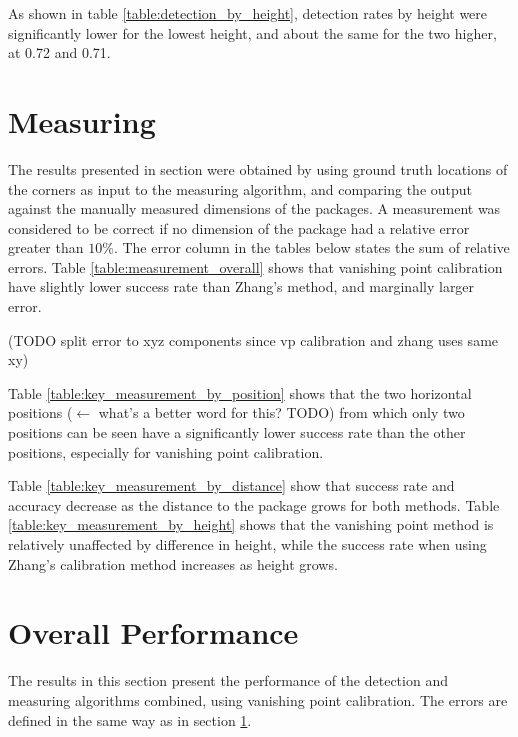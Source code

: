 As shown in table \ref{table:detection_by_height}, detection rates by height were significantly lower for the lowest height, and about the same for the two higher, at 0.72 and 0.71.


\section{Measuring} \label{results:measuring} 
The results presented in section were obtained by using ground truth locations of the corners as input to the measuring algorithm, and comparing the output against the manually measured dimensions of the packages.
A measurement was considered to be correct if no dimension of the package had a relative error greater than $10\%$.
The error column in the tables below states the sum of relative errors. 
Table \ref{table:measurement_overall} shows that vanishing point calibration have slightly lower success rate than Zhang's method, and marginally larger error.

(TODO split error to xyz components since vp calibration and zhang uses same xy) %






Table \ref{table:key_measurement_by_position} shows that the two horizontal positions ($\leftarrow$ what's a better word for this? TODO) from which only two positions can be seen have a significantly lower success rate than the other positions, especially for vanishing point calibration. %



Table \ref{table:key_measurement_by_distance} show that success rate and accuracy decrease as the distance to the package grows for both methods. Table \ref{table:key_measurement_by_height} shows that the vanishing point method is relatively unaffected by difference in height, while the success rate when using Zhang's calibration method increases as height grows.




\section{Overall Performance} \label{results:overall}
The results in this section present the performance of the detection and measuring algorithms combined, using vanishing point calibration.
The errors are defined in the same way as in section \ref{results:measuring}.

